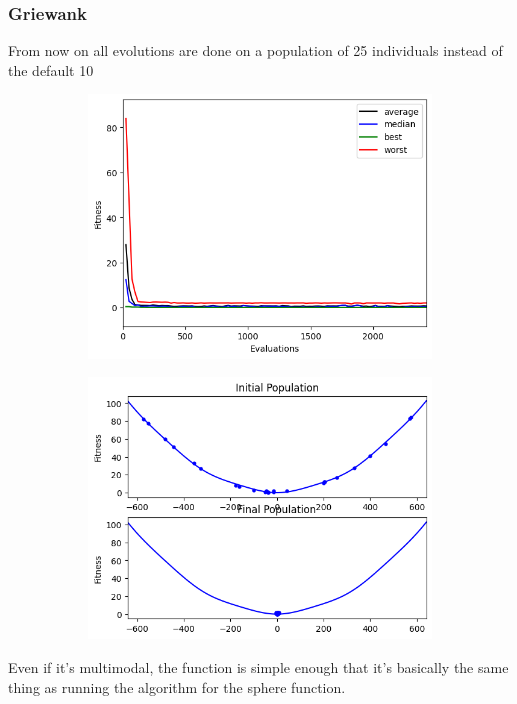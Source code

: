\subsubsection{Griewank}
From now on all evolutions are done on a population of 25 individuals instead of the default 10
\begin{figure}[H]
    \centering
    \begin{subfigure}[t]{0.5\textwidth}
        \centering
        \includegraphics[width=\linewidth]{images/lab2/grie_eval.png}
    \end{subfigure}%
    \begin{subfigure}[t]{0.5\textwidth}
        \centering
        \includegraphics[width=\linewidth]{images/lab2/grie_pop.png}
    \end{subfigure}
\end{figure}
Even if it's multimodal, the function is simple enough that it's basically the same thing as running the algorithm for the sphere function.

